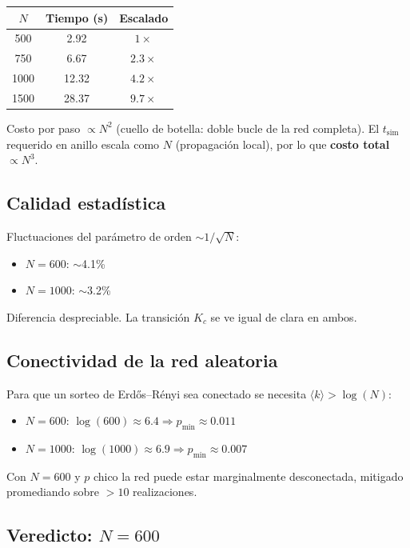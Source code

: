 \documentclass[11pt,a4paper]{article}
\begin{document}
\begin{center}
\begin{tabular}{c c c}
\toprule
$N$ & Tiempo (s) & Escalado \\
\midrule
500  & 2.92  & $1\times$ \\
750  & 6.67  & $2.3\times$ \\
1000 & 12.32 & $4.2\times$ \\
1500 & 28.37 & $9.7\times$ \\
\bottomrule
\end{tabular}
\end{center}

Costo por paso $\propto N^2$ (cuello de botella: doble bucle de la red completa). El $t_{\text{sim}}$ requerido en anillo escala como $N$ (propagación local), por lo que \textbf{costo total} $\propto N^3$.

\subsection*{Calidad estadística}

Fluctuaciones del parámetro de orden $\sim 1/\sqrt{N}$:
\begin{itemize}
\item $N=600$: $\sim$4.1\%
\item $N=1000$: $\sim$3.2\%
\end{itemize}

Diferencia despreciable. La transición $K_c$ se ve igual de clara en ambos.

\subsection*{Conectividad de la red aleatoria}

Para que un sorteo de Erdős--Rényi sea conectado se necesita $\langle k \rangle > \log(N)$:

\begin{itemize}
\item $N=600$: $\log(600) \approx 6.4 \Rightarrow p_{\min} \approx 0.011$
\item $N=1000$: $\log(1000) \approx 6.9 \Rightarrow p_{\min} \approx 0.007$
\end{itemize}

Con $N=600$ y $p$ chico la red puede estar marginalmente desconectada, mitigado promediando sobre $>10$ realizaciones.

\subsection*{Veredicto: $N = 600$}
\end{document}
